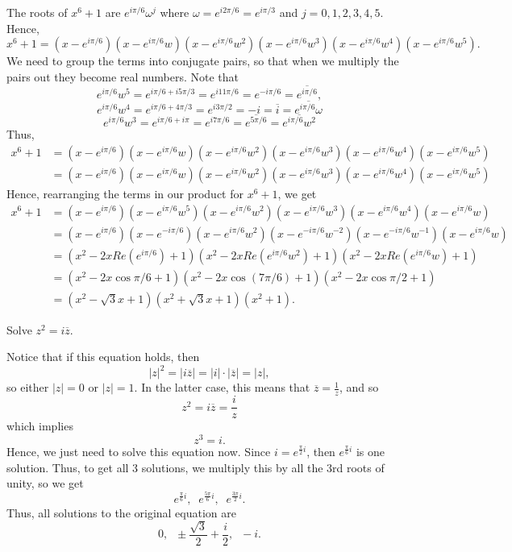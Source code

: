 \documentclass[11pt,dvipsnames]{book}
\numberwithin{equation}{section} %
\numberwithin{figure}{section} %
\numberwithin{table}{section} %
\begin{document}
\begin{exercise}
\begin{itemize}
\begin{solution}
The roots of $x^6+1$ are $e^{i\pi/6}\omega^{j}$ where $\omega= e^{i2\pi/6}=e^{i\pi/3}$ and $j=0,1,2,3,4,5$. Hence,
\[x^{6}+1
 =(x-e^{i\pi/6})(x-e^{i\pi/6}w)(x-e^{i\pi/6}w^2)(x-e^{i\pi/6}w^3)(x-e^{i\pi/6}w^4)(x-e^{i\pi/6}w^5).\]
We need to group the terms into conjugate pairs, so that when we multiply the pairs out they become real numbers. 
Note that 
\[
e^{i\pi/6}w^{5}=e^{i\pi/6+i5\pi/3}=e^{i11\pi/6}=e^{-i\pi/6}=\overline{e^{i\pi/6}},
\]
\[
e^{i\pi/6}w^{4}=e^{i\pi/6+4\pi/3}=e^{i3\pi/2}=-i=\overline{i}=\overline{e^{i\pi/6}\omega}
\]
\[
e^{i\pi/6}w^{3}=e^{i\pi/6+i\pi}=e^{i7\pi/6}=\overline{e^{5\pi/6}}
=\overline{e^{i\pi/6}w^{2}}
\]
Thus,
\begin{align*}
x^{6}+1
&  =(x-e^{i\pi/6})(x-e^{i\pi/6}w)(x-e^{i\pi/6}w^2)(x-e^{i\pi/6}w^3)(x-e^{i\pi/6}w^4)(x-e^{i\pi/6}w^5)\\
& = (x-e^{i\pi/6})(x-e^{i\pi/6}w)(x-e^{i\pi/6}w^2)(x-e^{i\pi/6}w^3)(x-e^{i\pi/6}w^4)(x-e^{i\pi/6}w^5)
\end{align*}
Hence, rearranging the terms in our product for $x^6+1$, we get
\begin{align*}
 x^6+1
&  =(x-e^{i\pi/6})(x-e^{i\pi/6}w^5)(x-e^{i\pi/6}w^2)(x-e^{i\pi/6}w^3)(x-e^{i\pi/6}w^4)(x-e^{i\pi/6}w)\\
& =(x-e^{i\pi/6})(x-e^{-i\pi/6})(x-e^{i\pi/6}w^2)(x-e^{-i\pi/6}w^{-2})(x-e^{-i\pi/6}w^{-1})(x-e^{i\pi/6}w)\\
& =(x^2-2xRe(e^{i\pi/6})+1)(x^2-2xRe(e^{i\pi/6}w^2)+1)(x^2-2xRe(e^{i\pi/6}w)+1)\\
& = (x^2-2x\cos\pi/6+1)(x^2-2x\cos(7\pi/6)+1)(x^2-2x\cos \pi/2+1)\\
& = (x^2-\sqrt{3}x+1)(x^2+\sqrt{3}x+1)(x^2+1).
\end{align*}


\end{solution}

\end{itemize}


\end{exercise}



\begin{exercise} Solve $z^2=i\overline{z}$. 

\begin{solution}
Notice that if this equation holds, then
\[
|z|^2=|i\overline{z}|=|i|\cdot |\overline{z}| = |z|,\]
so either $|z|=0$ or $|z|=1$. In the latter case, this means that $\overline{z} = \frac{1}{z}$, and so
\[
z^2=i\overline{z} = \frac{i}{z}\]
which implies
\[
z^3=i.
\]
Hence, we just need to solve this equation now. Since $i=e^{\frac{\pi}{2}i}$, then $e^{\frac{\pi}{6}i}$ is one solution. Thus, to get all 3 solutions, we multiply this by all the 3rd roots of unity, so we get
\[
e^{\frac{\pi}{6}i}, \;\; e^{\frac{5\pi}{6}i}, \;\; e^{\frac{3\pi}{2}i}.
\]
Thus, all solutions to the original equation are 
\[
0, \;\; \pm \frac{\sqrt{3}}{2}+\frac{i}{2}, \;\; -i.
\]

\end{solution}

\end{exercise}
\end{document}
